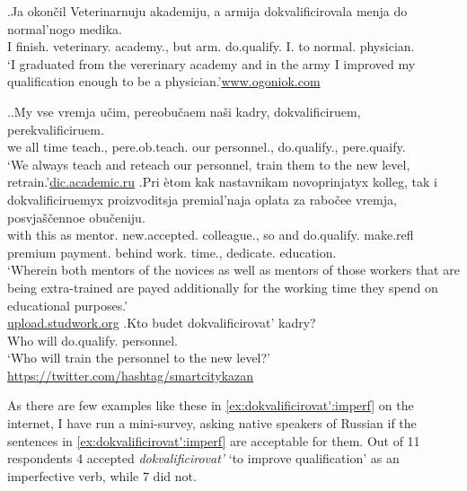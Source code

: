\exg.\label{ex:dokvalificirovat':perf}Ja okon\v{c}il Veterinarnuju akademiju, a armija dokvalificirovala menja do normal'nogo medika.\\
I finish. veterinary. academy., but arm. do.qualify. I. to normal. physician.\\
\trans `I graduated from the vererinary academy and in the army I improved my qualification enough to be a physician.'\hbox{}\hfill\hbox{\url{www.ogoniok.com}}

\ex.\label{ex:dokvalificirovat':imperf}\ag.\label{ex:dokvalificirovat':ongoing}My vse vremja u\v{c}im, pereobu\v{c}aem na\v{s}i kadry, dokvalificiruem, perekvalificiruem.\\
we all time teach., pere.ob.teach. our personnel., do.qualify., pere.quaify.\\
\trans `We always teach and reteach our personnel, train them to the new level, retrain.'\hbox{}\hfill\hbox{\url{dic.academic.ru}}
\bg.\label{ex:dokvalificirovat':part}Pri \`{e}tom kak nastavnikam novoprinjatyx kolleg, tak i dokvalificiruemyx proizvoditsja premial'naja oplata za rabo\v{c}ee vremja, posvja\v{s}\v{c}ennoe obu\v{c}eniju.\\
with this as mentor. new.accepted. colleague., so and do.qualify. make.refl premium payment. behind work. time., dedicate. education.\\
\trans `Wherein both mentors of the novices as well as mentors of those workers that are being extra-trained are payed additionally for the working time they spend on educational purposes.'\\\hbox{}\hfill\hbox{\url{upload.studwork.org}}
\bg.\label{ex:dokvalificirovat':future}Kto budet dokvalificirovat' kadry?\\
Who will do.qualify. personnel.\\
\trans `Who will train the personnel to the new level?'\\\hbox{}\hfill\hbox{\url{https://twitter.com/hashtag/smartcitykazan}}

As there are few examples like these in \ref{ex:dokvalificirovat':imperf} on the internet, I have run a mini-survey, asking native speakers of Russian if the sentences in \ref{ex:dokvalificirovat':imperf} are acceptable for them. Out of 11 respondents 4 accepted \textit{dokvalificirovat'} `to improve qualification' as an imperfective verb, while 7 did not.

